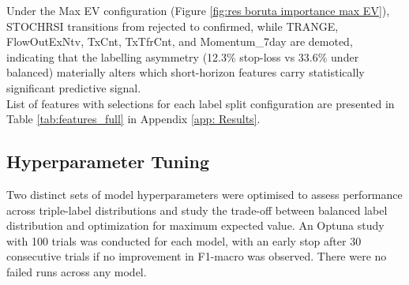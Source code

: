 Under the Max EV configuration (Figure \ref{fig:res boruta importance max EV}), STOCHRSI transitions from rejected to confirmed, while TRANGE, FlowOutExNtv, TxCnt, TxTfrCnt, and Momentum\_7day are demoted, indicating that the labelling asymmetry (12.3\% stop-loss vs 33.6\% under balanced) materially alters which short-horizon features carry statistically significant predictive signal.\\
\noindent List of features with selections for each label split configuration are presented in Table \ref{tab:features_full} in Appendix \ref{app: Results}.
\subsection{Hyperparameter Tuning}
Two distinct sets of model hyperparameters were optimised to assess performance across triple-label distributions and study the trade-off between balanced label distribution and optimization for maximum expected value. An Optuna study with 100 trials was conducted for each model, with an early stop after 30 consecutive trials if no improvement in F1-macro was observed. There were no failed runs across any model. 
